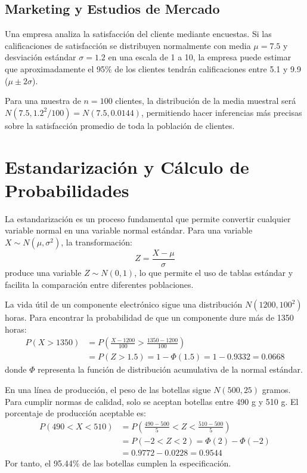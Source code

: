 \subsection{Marketing y Estudios de Mercado}

\begin{example}
Una empresa analiza la satisfacción del cliente mediante encuestas. Si las calificaciones de satisfacción se distribuyen normalmente con media $\mu = 7.5$ y desviación estándar $\sigma = 1.2$ en una escala de 1 a 10, la empresa puede estimar que aproximadamente el 95\% de los clientes tendrán calificaciones entre 5.1 y 9.9 ($\mu \pm 2\sigma$).

Para una muestra de $n = 100$ clientes, la distribución de la media muestral será $N(7.5, 1.2^2/100) = N(7.5, 0.0144)$, permitiendo hacer inferencias más precisas sobre la satisfacción promedio de toda la población de clientes.
\end{example}

\section{Estandarización y Cálculo de Probabilidades}

\begin{remark}
La estandarización es un proceso fundamental que permite convertir cualquier variable normal en una variable normal estándar. Para una variable $X \sim N(\mu, \sigma^2)$, la transformación:
\begin{equation}
Z = \frac{X - \mu}{\sigma}
\end{equation}
produce una variable $Z \sim N(0,1)$, lo que permite el uso de tablas estándar y facilita la comparación entre diferentes poblaciones.
\end{remark}

\begin{example}
La vida útil de un componente electrónico sigue una distribución $N(1200, 100^2)$ horas. Para encontrar la probabilidad de que un componente dure más de 1350 horas:
\begin{align}
P(X > 1350) &= P\left(\frac{X-1200}{100} > \frac{1350-1200}{100}\right)\\
&= P(Z > 1.5) = 1 - \Phi(1.5) = 1 - 0.9332 = 0.0668
\end{align}
donde $\Phi$ representa la función de distribución acumulativa de la normal estándar.
\end{example}

\begin{example}
En una línea de producción, el peso de las botellas sigue $N(500, 25)$ gramos. Para cumplir normas de calidad, solo se aceptan botellas entre 490 g y 510 g. El porcentaje de producción aceptable es:
\begin{align}
P(490 < X < 510) &= P\left(\frac{490-500}{5} < Z < \frac{510-500}{5}\right)\\
&= P(-2 < Z < 2) = \Phi(2) - \Phi(-2)\\
&= 0.9772 - 0.0228 = 0.9544
\end{align}
Por tanto, el 95.44\% de las botellas cumplen la especificación.
\end{example}

